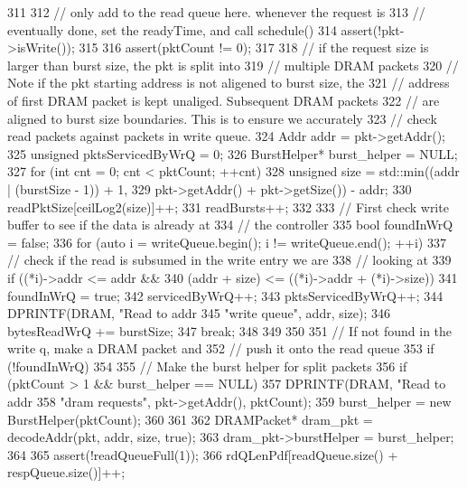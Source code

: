 \begin{DoxyCode}
311 {
312     // only add to the read queue here. whenever the request is
313     // eventually done, set the readyTime, and call schedule()
314     assert(!pkt->isWrite());
315 
316     assert(pktCount != 0);
317 
318     // if the request size is larger than burst size, the pkt is split into
319     // multiple DRAM packets
320     // Note if the pkt starting address is not aligened to burst size, the
321     // address of first DRAM packet is kept unaliged. Subsequent DRAM packets
322     // are aligned to burst size boundaries. This is to ensure we accurately
323     // check read packets against packets in write queue.
324     Addr addr = pkt->getAddr();
325     unsigned pktsServicedByWrQ = 0;
326     BurstHelper* burst_helper = NULL;
327     for (int cnt = 0; cnt < pktCount; ++cnt) {
328         unsigned size = std::min((addr | (burstSize - 1)) + 1,
329                         pkt->getAddr() + pkt->getSize()) - addr;
330         readPktSize[ceilLog2(size)]++;
331         readBursts++;
332 
333         // First check write buffer to see if the data is already at
334         // the controller
335         bool foundInWrQ = false;
336         for (auto i = writeQueue.begin(); i != writeQueue.end(); ++i) {
337             // check if the read is subsumed in the write entry we are
338             // looking at
339             if ((*i)->addr <= addr &&
340                 (addr + size) <= ((*i)->addr + (*i)->size)) {
341                 foundInWrQ = true;
342                 servicedByWrQ++;
343                 pktsServicedByWrQ++;
344                 DPRINTF(DRAM, "Read to addr %
345                         "write queue\n", addr, size);
346                 bytesReadWrQ += burstSize;
347                 break;
348             }
349         }
350 
351         // If not found in the write q, make a DRAM packet and
352         // push it onto the read queue
353         if (!foundInWrQ) {
354 
355             // Make the burst helper for split packets
356             if (pktCount > 1 && burst_helper == NULL) {
357                 DPRINTF(DRAM, "Read to addr %
358                         "dram requests\n", pkt->getAddr(), pktCount);
359                 burst_helper = new BurstHelper(pktCount);
360             }
361 
362             DRAMPacket* dram_pkt = decodeAddr(pkt, addr, size, true);
363             dram_pkt->burstHelper = burst_helper;
364 
365             assert(!readQueueFull(1));
366             rdQLenPdf[readQueue.size() + respQueue.size()]++;
}}}
\end{DoxyCode}
